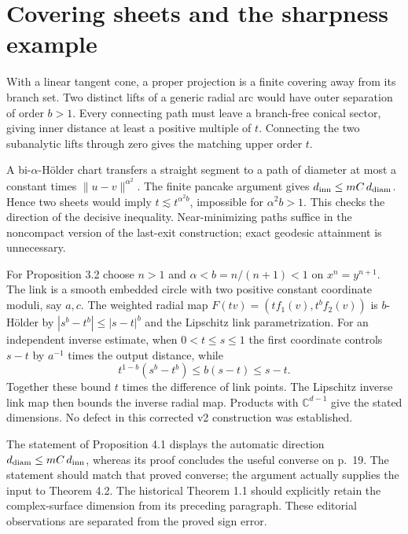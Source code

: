 \documentclass[10pt]{article}
\begin{document}
\section*{Covering sheets and the sharpness example}
With a linear tangent cone, a proper projection is a finite covering away from its branch set. Two distinct lifts of a generic radial arc would have outer separation of order \(b>1\). Every connecting path must leave a branch-free conical sector, giving inner distance at least a positive multiple of \(t\). Connecting the two subanalytic lifts through zero gives the matching upper order \(t\).\par
A bi-\(\alpha\)-Hölder chart transfers a straight segment to a path of diameter at most a constant times \(\|u-v\|^{\alpha^2}\). The finite pancake argument gives \(d_{\rm inn}\leq mC\,d_{\rm diam}\). Hence two sheets would imply \(t\lesssim t^{\alpha^2b}\), impossible for \(\alpha^2b>1\). This checks the direction of the decisive inequality. Near-minimizing paths suffice in the noncompact version of the last-exit construction; exact geodesic attainment is unnecessary.\par
For Proposition 3.2 choose \(n>1\) and \(\alpha<b=n/(n+1)<1\) on \(x^n=y^{n+1}\). The link is a smooth embedded circle with two positive constant coordinate moduli, say \(a,c\). The weighted radial map \(F(tv)=(t f_1(v),t^b f_2(v))\) is \(b\)-Hölder by \(|s^b-t^b|\leq|s-t|^b\) and the Lipschitz link parametrization. For an independent inverse estimate, when \(0<t\leq s\leq1\) the first coordinate controls \(s-t\) by \(a^{-1}\) times the output distance, while \[t^{1-b}(s^b-t^b)\leq b(s-t)\leq s-t .\] Together these bound \(t\) times the difference of link points. The Lipschitz inverse link map then bounds the inverse radial map. Products with \(\mathbb C^{d-1}\) give the stated dimensions. No defect in this corrected v2 construction was established.\par
The statement of Proposition 4.1 displays the automatic direction \(d_{\rm diam}\leq mC\,d_{\rm inn}\), whereas its proof concludes the useful converse on p. 19. The statement should match that proved converse; the argument actually supplies the input to Theorem 4.2. The historical Theorem 1.1 should explicitly retain the complex-surface dimension from its preceding paragraph. These editorial observations are separated from the proved sign error.\par
\end{document}
